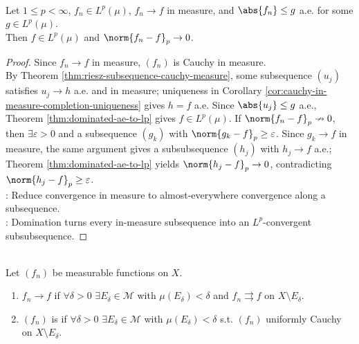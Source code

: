 \begin{theorem} \label{thm:dominated-measure-to-lp} \\
Let $1\leq p<\infty$, $f_n\in L^p(\mu)$, $f_n\to f$ in measure, and $\abs{f_n}\leq g$ a.e. for some $g\in L^p(\mu)$.\\
Then $f\in L^p(\mu)$ and $\norm{f_n-f}_p\to0$.
\begin{proof}
Since $f_n\to f$ in measure, $(f_n)$ is Cauchy in measure.\\
By Theorem \ref{thm:riesz-subsequence-cauchy-measure}, some subsequence $(u_j)$ satisfies $u_j\to h$ a.e. and in measure; uniqueness in Corollary \ref{cor:cauchy-in-measure-completion-uniqueness} gives $h=f$ a.e. Since $\abs{u_j}\leq g$ a.e., Theorem \ref{thm:dominated-ae-to-lp} gives $f\in L^p(\mu)$. If $\norm{f_n-f}_p\nrightarrow0$, then $\exists\varepsilon>0$ and a subsequence $(g_k)$ with $\norm{g_k-f}_p\geq\varepsilon$. Since $g_k\to f$ in measure, the same argument gives a subsubsequence $(h_j)$ with $h_j\to f$ a.e.; Theorem \ref{thm:dominated-ae-to-lp} yields $\norm{h_j-f}_p\to0$, contradicting $\norm{h_j-f}_p\geq\varepsilon$.\\
: Reduce convergence in measure to almost-everywhere convergence along a subsequence.\\
: Domination turns every in-measure subsequence into an $L^p$-convergent subsubsequence.
\end{proof}
\end{theorem}

\begin{definition} \label{def:almost-uniform-convergence} \\
Let $(f_n)$ be measurable functions on $X$.
\begin{enumerate}[label=(\roman*)]
\setlength{\itemsep}{0pt}
\item $f_n\to f$  if $\forall\delta>0$ $\exists E_\delta\in\mathcal{M}$ with $\mu(E_\delta)<\delta$ and $f_n\rightrightarrows f$ on $X\setminus E_\delta$.
\item $(f_n)$ is  if $\forall\delta>0$ $\exists E_\delta\in\mathcal{M}$ with $\mu(E_\delta)<\delta$ s.t. $(f_n)$ uniformly Cauchy on $X\setminus E_\delta$.
\end{enumerate}
\end{definition}

